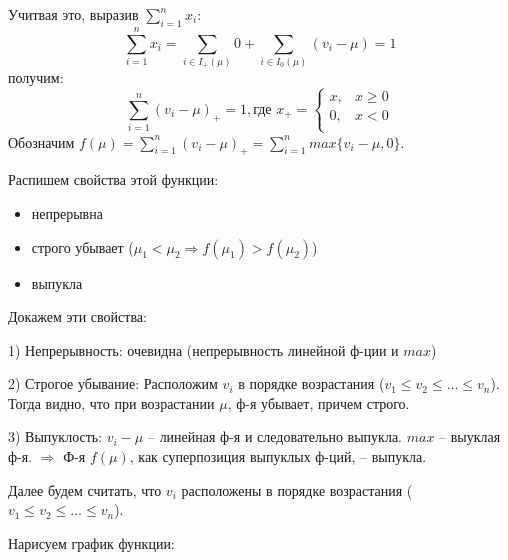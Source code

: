 \documentclass[12pt, a4paper]{article}
\begin{document}
    Учитвая это, выразив $\displaystyle\sum_{i=1}^n x_i$:
    $$\displaystyle\sum_{i=1}^n x_i = \displaystyle\sum_{i \in I_+(\mu)} 0 + \displaystyle\sum_{i \in I_0(\mu)} (v_i - \mu) = 1$$
    получим:
    $$\displaystyle\sum_{i=1}^n (v_i - \mu)_+ = 1, \text{где } x_+ =
    \begin{cases}
        x, & x \geq 0 \\
        0, & x < 0 \\
    \end{cases}
    $$
    Обозначим $f(\mu) = \displaystyle\sum_{i=1}^n (v_i - \mu)_+ = \displaystyle\sum_{i=1}^n max\{v_i - \mu, 0\}$.

    Распишем свойства этой функции:
    \begin{itemize}
        \item непрерывна
        \item строго убывает ($\mu_1 < \mu_2 \Rightarrow f(\mu_1) > f(\mu_2)$)
        \item выпукла
    \end{itemize}

    Докажем эти свойства:

    1) Непрерывность: очевидна (непрерывность линейной ф-ции и $max$)

    2) Строгое убывание: Расположим $v_i$ в порядке возрастания ($v_1 \leq v_2 \leq \dots \leq v_n$). Тогда видно, что при возрастании $\mu$, ф-я убывает, причем строго.

    3) Выпуклость: $v_i - \mu$ -- линейная ф-я и следовательно выпукла. $max$ -- выуклая ф-я. $\Rightarrow$ Ф-я $f(\mu)$, как суперпозиция выпуклых ф-ций, -- выпукла.

    Далее будем считать, что $v_i$ расположены в порядке возрастания ($v_1 \leq v_2 \leq \dots \leq v_n$).

    Нарисуем график функции:

    \begin{center}
    \end{center}
\end{document}
